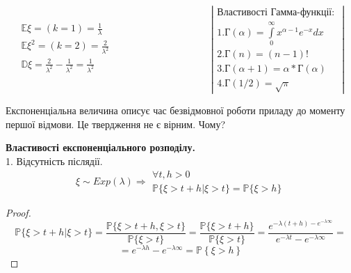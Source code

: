 \documentclass[14pt,a4paper]{scrartcl}
\theoremstyle{definition}
\theoremstyle{remark}
\theoremstyle{definition}
\theoremstyle{definition}
\begin{document}
$$
\begin{gathered}
 \mathbb{E} \xi = (k=1) = \frac{1}{\lambda} \\
 \mathbb{E} \xi^2 = (k=2) = \frac{2}{\lambda^2} \\
 \mathbb{D} \xi =  \frac{2}{\lambda^2}  - \frac{1}{\lambda^2} = \frac{1}{\lambda^2}  \\
\end{gathered}
\qquad \qquad\qquad\qquad\qquad
\left|
\begin{gathered}
\textbf{Властивості Гамма-функції: }\\
 1. \text{Г}(\alpha) =  \int\limits_{0}^{ \infty}{ x^{\alpha -1 } e^{-x} dx}\\
 2. \text{Г} (n) = (n-1)!\\
 3. \text{Г} (\alpha+1) = \alpha * \text{Г}(\alpha)\\
 4. \text{Г} (1/2) = \sqrt{\pi}
\end{gathered}
\right|
$$

\begin{center}
	Експоненціальна величина описує час безвідмовної роботи приладу до моменту першої відмови. Це твердження не є вірним. Чому?
\end{center}

\textbf{Властивості експоненціального розподілу.}\\
1. Відсутність післядії. \\
$$ \xi \sim Exp(\lambda) \Rightarrow  \begin{gathered}
 \forall t, h > 0 \\
 \mathbb{P} \{ \xi > t+h \big| \xi >t \}  = \mathbb{P} \{ \xi > h \}
\end{gathered}
$$

\begin{proof}
$$
 \mathbb{P} \{ \xi > t+h \big| \xi >t \}  = \frac{ \mathbb{P} \{ \xi > t+h, \xi > t \}}{ \mathbb{P} \{ \xi > t \}} =
  \frac{ \mathbb{P} \{ \xi > t+h \}}{\mathbb{P} \{ \xi > t \} }=
 \frac{ e^{-\lambda (t+h) - e^{-\lambda \infty}} }{ e^{- \lambda t} - e^ {-\lambda \infty} } =
 $$
$$
= e^{-\lambda h} - e^{-\lambda\infty } = \mathbb{P} \left\lbrace \xi  > h \right\rbrace
$$
\end{proof}
\end{document}
